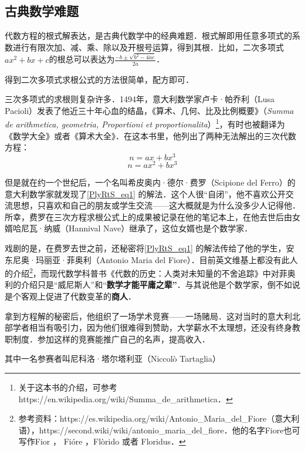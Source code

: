 


\subsection{古典数学难题}

代数方程的根式解表达，是古典代数学中的经典难题．根式解即用任意多项式的系数进行有限次加、减、乘、除以及开根号运算，得到其根．比如，二次多项式$ax^2+bx+c$的根总可以表达为$\frac{-b\pm\sqrt{b^2-4ac}}{2a}$．

得到二次多项式求根公式的方法很简单，配方即可．

三次多项式的求根则复杂许多．1494年，意大利数学家卢卡·帕乔利（Lusa Pacioli）发表了他近三十年心血的结晶，《算术、几何、比及比例概要》（\textsl{Summa de arithmetica, geometria, Proportioni et proportionalita}）\footnote{关于这本书的介绍，可参考https://en.wikipedia.org/wiki/Summa_de_arithmetica．}，有时也被翻译为《数学大全》或者《算术大全》．在这本书里，他列出了两种无法解出的三次代数方程：
\begin{equation}\label{PlyRtS_eq1}
n=ax+bx^3
\end{equation}
\begin{equation}
n=ax^2+bx^3
\end{equation}

但是就在约一个世纪后，一个名叫希皮奥内·德尔·费罗（Scipione del Ferro）的意大利数学家就发现了\autoref{PlyRtS_eq1} 的解法．这个人很“自闭”，他不喜欢公开交流思想，只喜欢和自己的朋友或学生交流——这大概就是为什么没多少人记得他．所幸，费罗在三次方程求根公式上的成果被记录在他的笔记本上，在他去世后由女婿哈尼瓦·纳威（Hannival Nave）继承了，这位女婿也是个数学家．

戏剧的是，在费罗去世之前，还秘密将\autoref{PlyRtS_eq1} 的解法传给了他的学生，安东尼奥·玛丽亚·菲奥利（Antonio Maria del Fiore）．目前英文维基上都没有此人的介绍\footnote{参考资料：https://es.wikipedia.org/wiki/Antonio_Maria_del_Fiore（意大利语），https://second.wiki/wiki/antonio_maria_del_fiore．他的名字Fiore也可写作Fior ， Fióre ，Flòrido 或者 Floridus．}，而现代数学科普书《代数的历史：人类对未知量的不舍追踪》中对菲奥利的介绍只是“威尼斯人”和“\textbf{数学才能平庸之辈”}．与其说他是个数学家，倒不如说是个客观上促进了代数变革的\textbf{商人}．

拿到方程解的秘密后，他组织了一场学术竞赛——一场赌局．这对当时的意大利北部学者相当有吸引力，因为他们很难得到赞助，大学薪水不太理想，还没有终身教职制度．参加这样的竞赛能推广自己的名声，提高收入．

其中一名参赛者叫尼科洛·塔尔塔利亚（Niccolò Tartaglia）





















